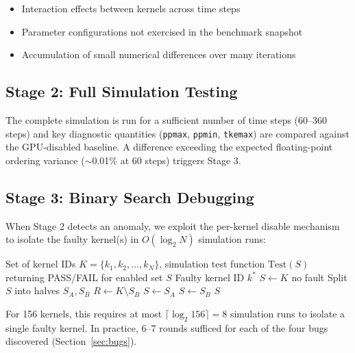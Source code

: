 \documentclass[conference]{IEEEtran}
\begin{document}
\begin{itemize}
\item Interaction effects between kernels across time steps
\item Parameter configurations not exercised in the benchmark snapshot
\item Accumulation of small numerical differences over many iterations
\end{itemize}

\subsection{Stage 2: Full Simulation Testing}

The complete simulation is run for a sufficient number of time steps (60--360
steps) and key diagnostic quantities (\texttt{ppmax}, \texttt{ppmin},
\texttt{tkemax}) are compared against the GPU-disabled baseline. A
difference exceeding the expected floating-point ordering variance
($\sim$0.01\% at 60 steps) triggers Stage 3.

\subsection{Stage 3: Binary Search Debugging}

When Stage 2 detects an anomaly, we exploit the per-kernel disable mechanism
to isolate the faulty kernel(s) in $O(\log_2 N)$ simulation runs:

\begin{algorithm}[t]
\caption{Binary search kernel debugging.}
\label{alg:bsearch}
\begin{algorithmic}[1]
\Require Set of kernel IDs $K = \{k_1, k_2, \ldots, k_N\}$, simulation
  test function $\text{Test}(S)$ returning PASS/FAIL for enabled set $S$
\Ensure Faulty kernel ID $k^*$
\State $S \gets K$ 
  \State \Return no fault
\EndIf
{}
  \State Split $S$ into halves $S_A, S_B$
  \State $R \gets K \setminus S_B$ 
    \State $S \gets S_A$ 
  \Else
    \State $S \gets S_B$ 
  \EndIf
\EndWhile
\State \Return $S$ 
\end{algorithmic}
\end{algorithm}

For 156 kernels, this requires at most $\lceil \log_2 156 \rceil = 8$
simulation runs to isolate a single faulty kernel. In practice, 6--7 rounds
sufficed for each of the four bugs discovered (Section~\ref{sec:bugs}).
\end{document}
